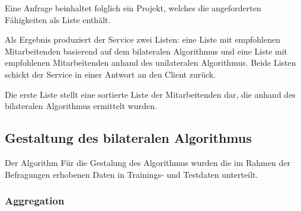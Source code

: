 

Eine Anfrage beinhaltet folglich ein Projekt, welches die angeforderten Fähigkeiten als Liste enthält. 

Als Ergebnis produziert der Service zwei Listen: eine Liste mit empfohlenen Mitarbeitenden basierend auf dem bilateralen Algorithmus und eine Liste mit empfohlenen Mitarbeitenden anhand des unilateralen Algorithmus.
Beide Listen schickt der Service in einer Antwort an den Client zurück.

Die erste Liste stellt eine sortierte Liste der Mitarbeitenden dar, die anhand des bilateralen Algorithmus ermittelt wurden.


\subsection{Gestaltung des bilateralen Algorithmus}
Der Algorithm
Für die Gestalung des Algorithmus wurden die im Rahmen der Befragungen erhobenen Daten in Trainings- und Testdaten unterteilt.

\subsubsection{Aggregation}

